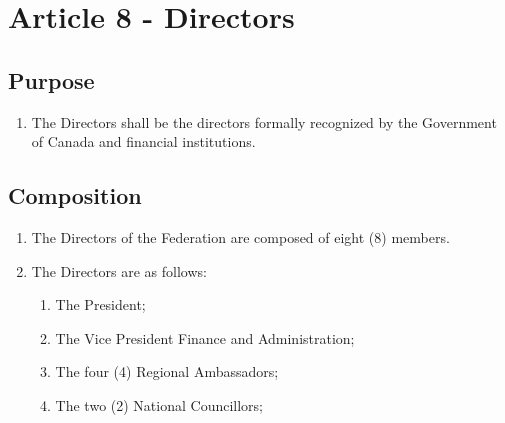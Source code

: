 \section{Article 8 - Directors}
\label{article-8-directors}

\subsection{Purpose}
\label{purpose-directors}

\begin{enumerate}
 \item The Directors shall be the directors formally recognized by the Government of Canada and financial institutions.
\end{enumerate}

\subsection{Composition}
\label{composition-directors}

\begin{enumerate}
 \item The Directors of the Federation are composed of eight (8) members.
 \item The Directors are as follows:
  \begin{enumerate}
   \item The President;
   \item The Vice President Finance and Administration;
   \item The four (4) Regional Ambassadors;
   \item The two (2) National Councillors;
  \end{enumerate}
\end{enumerate}

